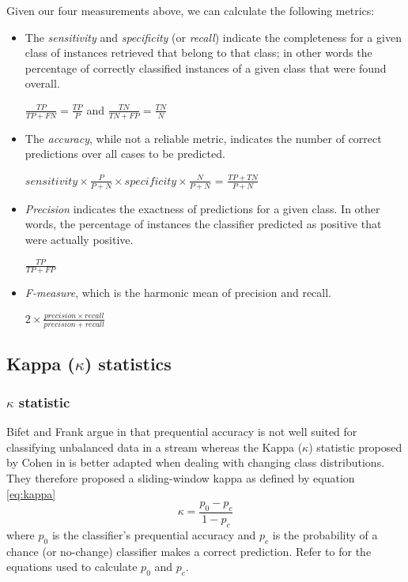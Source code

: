 Given our four measurements above, we can calculate the following metrics:
\begin{itemize}
\item The \textit{sensitivity} and \textit{specificity} (or \textit{recall}) indicate the completeness for a given class of instances retrieved that belong to that class; in other words the percentage of correctly classified instances of a given class that were found overall.\begin{center}$\frac{TP}{TP+FN}=\frac{TP}{P}$ and $\frac{TN}{TN+FP}=\frac{TN}{N}$\end{center}
\item The \textit{accuracy}, while not a reliable metric, indicates the number of correct predictions over all cases to be predicted.\begin{center}$sensitivity\times\frac{P}{P+N}\times specificity\times\frac{N}{P+N}$ = $\frac{TP+TN}{P+N}$\end{center}
\item \textit{Precision} indicates the exactness of predictions for a given class. In other words, the percentage of instances the classifier predicted as positive that were actually positive.\begin{center}$\frac{TP}{TP+FP}$\end{center}
\item \textit{F-measure}, which is the harmonic mean of precision and recall. \begin{center}$2\times\frac{precision\times recall}{precision+recall}$\end{center}
\end{itemize}

\subsection{Kappa ($\kappa$) statistics}
\subsubsection{$\kappa$ statistic}
Bifet and Frank argue in \cite{bifet2010sentiment} that prequential accuracy is not well suited for classifying unbalanced data in a stream whereas the Kappa ($\kappa$) statistic proposed by Cohen in \cite{cohen1960coefficient} is better adapted when dealing with changing class distributions. They therefore proposed a sliding-window kappa as defined by equation \ref{eq:kappa}
\begin{equation}
\kappa=\frac{p_0-p_c}{1-p_c}
\label{eq:kappa}
\end{equation}where $p_0$ is the classifier's prequential accuracy and $p_c$ is the probability of a chance (or no-change) classifier makes a correct prediction. Refer to \cite{bifet2010sentiment} for the equations used to calculate $p_0$ and $p_c$.

